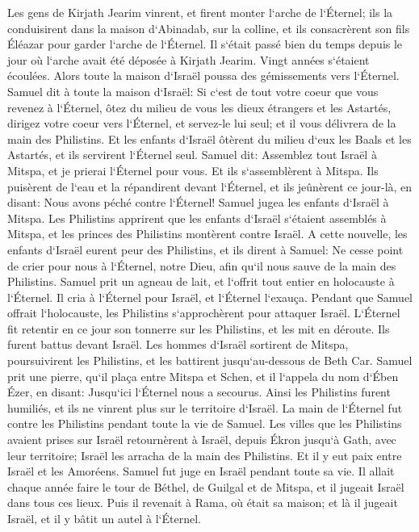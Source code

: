 \verse Les gens de Kirjath Jearim vinrent, et firent monter l`arche de l`Éternel; ils la conduisirent dans la maison d`Abinadab, sur la colline, et ils consacrèrent son fils Éléazar pour garder l`arche de l`Éternel. 
\verse Il s`était passé bien du temps depuis le jour où l`arche avait été déposée à Kirjath Jearim. Vingt années s`étaient écoulées. Alors toute la maison d`Israël poussa des gémissements vers l`Éternel. 
\verse Samuel dit à toute la maison d`Israël: Si c`est de tout votre coeur que vous revenez à l`Éternel, ôtez du milieu de vous les dieux étrangers et les Astartés, dirigez votre coeur vers l`Éternel, et servez-le lui seul; et il vous délivrera de la main des Philistins. 
\verse Et les enfants d`Israël ôtèrent du milieu d`eux les Baals et les Astartés, et ils servirent l`Éternel seul. 
\verse Samuel dit: Assemblez tout Israël à Mitspa, et je prierai l`Éternel pour vous. Et ils s`assemblèrent à Mitspa. 
\verse Ils puisèrent de l`eau et la répandirent devant l`Éternel, et ils jeûnèrent ce jour-là, en disant: Nous avons péché contre l`Éternel! Samuel jugea les enfants d`Israël à Mitspa. 
\verse Les Philistins apprirent que les enfants d`Israël s`étaient assemblés à Mitspa, et les princes des Philistins montèrent contre Israël. A cette nouvelle, les enfants d`Israël eurent peur des Philistins, 
\verse et ils dirent à Samuel: Ne cesse point de crier pour nous à l`Éternel, notre Dieu, afin qu`il nous sauve de la main des Philistins. 
\verse Samuel prit un agneau de lait, et l`offrit tout entier en holocauste à l`Éternel. Il cria à l`Éternel pour Israël, et l`Éternel l`exauça. 
\verse Pendant que Samuel offrait l`holocauste, les Philistins s`approchèrent pour attaquer Israël. L`Éternel fit retentir en ce jour son tonnerre sur les Philistins, et les mit en déroute. Ils furent battus devant Israël. 
\verse Les hommes d`Israël sortirent de Mitspa, poursuivirent les Philistins, et les battirent jusqu`au-dessous de Beth Car. 
\verse Samuel prit une pierre, qu`il plaça entre Mitspa et Schen, et il l`appela du nom d`Ében Ézer, en disant: Jusqu`ici l`Éternel nous a secourus. 
\verse Ainsi les Philistins furent humiliés, et ils ne vinrent plus sur le territoire d`Israël. La main de l`Éternel fut contre les Philistins pendant toute la vie de Samuel. 
\verse Les villes que les Philistins avaient prises sur Israël retournèrent à Israël, depuis Ékron jusqu`à Gath, avec leur territoire; Israël les arracha de la main des Philistins. Et il y eut paix entre Israël et les Amoréens. 
\verse Samuel fut juge en Israël pendant toute sa vie. 
\verse Il allait chaque année faire le tour de Béthel, de Guilgal et de Mitspa, et il jugeait Israël dans tous ces lieux. 
\verse Puis il revenait à Rama, où était sa maison; et là il jugeait Israël, et il y bâtit un autel à l`Éternel. 

